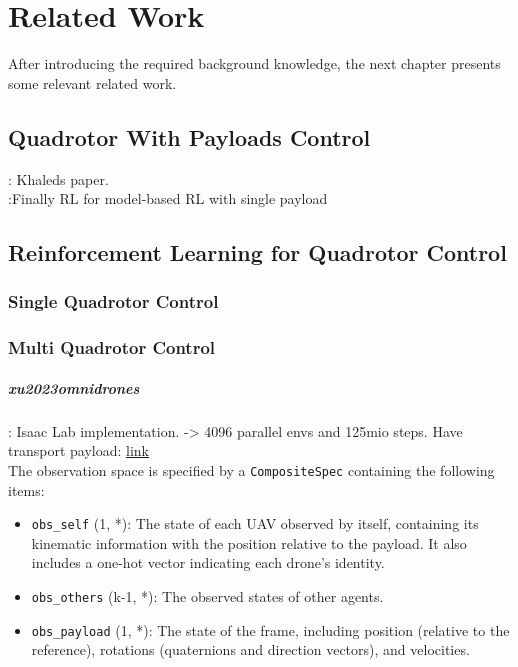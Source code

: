 \chapter{Related Work}
After introducing the required background knowledge, the next chapter presents some relevant related work.
\section{Quadrotor With Payloads Control}
\autocite{Wahba2024}: Khaleds paper.\\

\autocite{Belkhale2021}:Finally RL for model-based RL with single payload 
\section{Reinforcement Learning for Quadrotor Control}
\subsection{Single Quadrotor Control}

\subsection{Multi Quadrotor Control}


\paragraph{xu2023omnidrones}
\autocite{xu2023omnidrones}: Isaac Lab implementation. -> 4096 parallel envs and 125mio steps. Have transport payload: 
\href{https://omnidrones.readthedocs.io/en/latest/tasks/multi/TransportTrack.html#transporttrack}{link} \\

The observation space is specified by a \texttt{CompositeSpec} containing the following items:
\begin{itemize}
    \item \texttt{obs\_self} (1, *): The state of each UAV observed by itself, containing its kinematic information with the position relative to the payload. It also includes a one-hot vector indicating each drone’s identity.
    
    \item \texttt{obs\_others} (k-1, *): The observed states of other agents.
    \item \texttt{obs\_payload} (1, *): The state of the frame, including position (relative to the reference), rotations (quaternions and direction vectors), and velocities.
\end{itemize}


